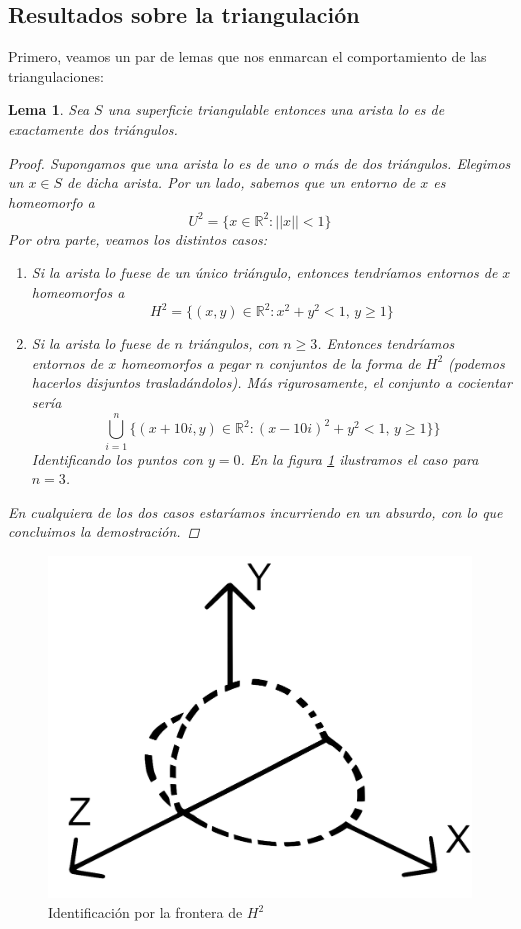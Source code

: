 \documentclass[a4paper,11pt,spanish, twoside, leqno]{tfg-uam}
\newcommand*{\reales}{\mathbb{R}}
\newtheorem{lema}[teor]{Lema}
\theoremstyle{definition}
\begin{document}
\subsection*{Resultados sobre la triangulación}

Primero, veamos un par de lemas que nos enmarcan el comportamiento de las triangulaciones:

\begin{lema}\label{lema:lema1detriangulacion}
Sea $S$ una superficie triangulable entonces una arista lo es de exactamente dos triángulos.

\begin{proof}
Supongamos que una arista lo es de uno o más de dos triángulos. Elegimos un $x\in S$ de dicha arista. Por un lado, sabemos que un entorno de $x$ es homeomorfo a 
\[U^2 = \{x\in\reales^2: ||x||<1\}\]
Por otra parte, veamos los distintos casos:

\begin{enumerate}
\item[(a)] Si la arista lo fuese de un único triángulo, entonces tendríamos entornos de $x$ homeomorfos a
\[ H^2 = \{(x,y)\in\reales^2: x^2+y^2<1, \, y\geq 1 \} \]

\item[(b)] Si la arista lo fuese de  $n$ triángulos, con $n\geq 3$. Entonces tendríamos entornos de $x$ homeomorfos a pegar $n$ conjuntos de la forma de $H^2$ (podemos hacerlos disjuntos trasladándolos). Más rigurosamente, el conjunto a cocientar sería
\[
   \bigcup^n_{i=1} \{(x+10i,y)\in\reales^2: (x-10i)^2+y^2<1, \, y\geq 1 \} \}	        
\]
Identificando los puntos con $y=0$. En la figura \ref{fig:tripleplano} ilustramos el caso para $n=3$.
\end{enumerate}    

En cualquiera de los dos casos estaríamos incurriendo en un absurdo, con lo que concluimos la demostración.
\end{proof}
\end{lema}

\begin{figure}[h!]
	\centering
	\includegraphics[width=0.4\linewidth]{imagenes/tripleplano.png}
	\caption{Identificación por la frontera de $H^2$}
	\label{fig:tripleplano}
\end{figure}
\end{document}

